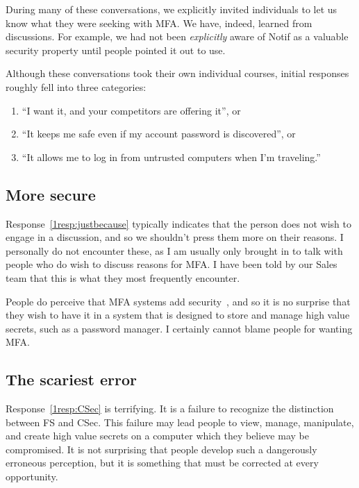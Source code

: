 \documentclass[12pt]{article}
\newcommand{\prop}[1]{\textsf{#1}}
\begin{document}
During many of these conversations,
we explicitly invited individuals to let us know what they were seeking with MFA\@.
We have, indeed, learned from discussions.
For example, we had not been \emph{explicitly} aware of \prop{Notif} as a valuable security property until people pointed it out to use.

Although these conversations took their own individual courses,
initial responses roughly fell into three categories:
\begin{enumerate}
  \item “I want it, and your competitors are offering it”, or \label{1resp:justbecause}
  \item “It keeps me safe even if my account password is discovered”, or \label{1resp:FS}
  \item “It allows me to log in from untrusted computers when I'm traveling.”\label{1resp:CSec}
\end{enumerate}

\subsection{More secure}
Response~\ref{1resp:justbecause} typically indicates that the person does not wish to engage in a discussion, and so we shouldn't press them more on their reasons.
I personally do not encounter these, as I am usually only brought in to talk with people who do wish to discuss reasons for MFA\@.
I have been told by our Sales team that this is what they most frequently encounter.

People do perceive that MFA systems add security~\autocites{gunsonETAL2011:CS,CristofaroDFN13},
and so it is no surprise that they wish to have it in a system that is designed to store and manage high value secrets, such as a password manager.
I certainly cannot blame people for wanting MFA\@.

\subsection{The scariest error}

Response~\ref{1resp:CSec} is terrifying.
It is a failure to recognize the distinction between \prop{FS} and  \prop{CSec}.
This failure may lead people to view, manage, manipulate, and create high value
secrets on a computer which they believe may be compromised.
It is not surprising that people develop such a dangerously erroneous perception, but it is something that must be corrected at every opportunity.
\end{document}
